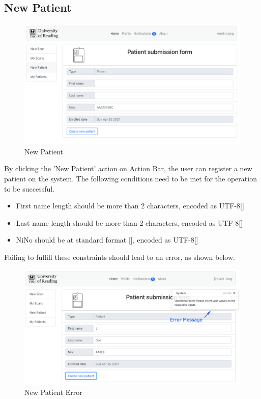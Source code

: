 		\subsection{New Patient}
			\begin{figure}[H]
				\iftrue
				\centering
				\caption{New Patient}
				\includegraphics[scale=0.3]{figures/newpatient}
				\fi
			\end{figure}
			By clicking the 'New Patient' action on Action Bar, the user can register a new patient on the system. The following conditions need to 
			be met for the operation to be successful.
			\begin{itemize}
				\item First name length should be more than 2 characters, encoded as UTF-8[\cite{rfc3629}]
				\item Last name length should be more than 2 characters, encoded as UTF-8[\cite{rfc3629}]
				\item NiNo should be at standard format [\cite{nino-format}], encoded as UTF-8[\cite{rfc3629}]
			\end{itemize}
			Failing to fulfill these constraints should lead to an error, as shown below.
			\begin{figure}[H]
				\iftrue
				\centering
					\caption{New Patient Error}
				\includegraphics[scale=0.3]{figures/newpatient-error}
				\fi
			\end{figure}
